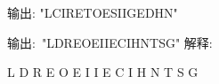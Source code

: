 输出: "LCIRETOESIIGEDHN"

输出: "LDREOEIIECIHNTSG"
解释:

L     D     R
E   O E   I I
E C   I H   N
T     S     G
